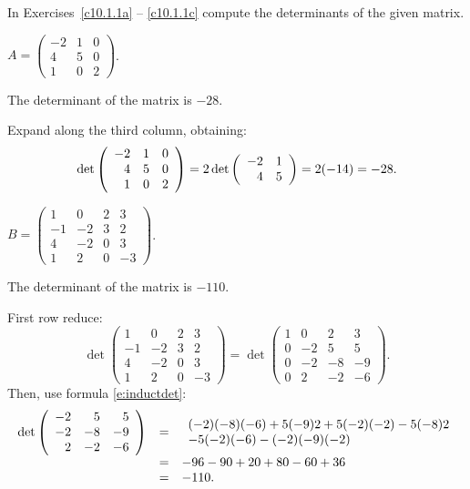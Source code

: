 \documentclass{ximera}
\begin{document}
\TEXER


\noindent  In Exercises~\ref{c10.1.1a} -- \ref{c10.1.1c} compute the 
determinants of the given matrix.
\begin{exercise} \label{c10.1.1a}
$A = \left(\begin{array}{rrr} -2 & 1 & 0 \\ 4 & 5& 0 \\ 1 & 0 & 2
\end{array} \right)$.

\begin{solution}

\ans The determinant of the matrix is $-28$.

\soln Expand along the third column, obtaining:
\[
\det\left(\begin{array}{rrr} -2 & 1 & 0 \\ 4 & 5 & 0 \\ 1 & 0 & 2\end{array}\right) = 2\det\left(\begin{array}{rr} -2 & 1\\ 4 &5\end{array}\right)
= 2(-14) = -28.
\]

\end{solution}
\end{exercise} 
\begin{exercise} \label{c10.1.1b}
$B = \left(\begin{array}{rrrr} 1 & 0 & 2 & 3 \\ -1 & -2 & 3 & 2
\\ 4 & -2 & 0 & 3 \\ 1 & 2 & 0 & -3 \end{array} \right)$.

\begin{solution}

\ans The determinant of the matrix is $-110$.

\soln First row reduce:
\[
\det\left(\begin{array}{rrrr}
1 & 0 & 2 & 3 \\ 
-1 & -2 & 3 & 2 \\
4 & -2 & 0 & 3 \\
1 & 2 & 0 & -3 \end{array}\right) =
\det\left(\begin{array}{rrrr}
1 & 0 & 2 & 3 \\ 
0 & -2 & 5 & 5 \\
0 & -2 & -8 & -9 \\
0 & 2 & -2 & -6 \end{array}\right).
\]
Then, use formula \eqref{e:inductdet}:
\[ \begin{array}{rcl}
\det\left(\begin{array}{rrr} -2 & 5 & 5 \\ -2 & -8 & -9 \\ 2 & -2 & -6\end{array}\right) & = &
\begin{array}{l}
(-2)(-8)(-6) + 5(-9)2 + 5(-2)(-2) - 5(-8)2 \\
- 5(-2)(-6) - (-2)(-9)(-2) \end{array} \\
& = & -96 - 90 + 20 + 80 - 60 + 36 \\
& = & -110.
\end{array}
\]

\end{solution}
\end{exercise}
\end{document}
